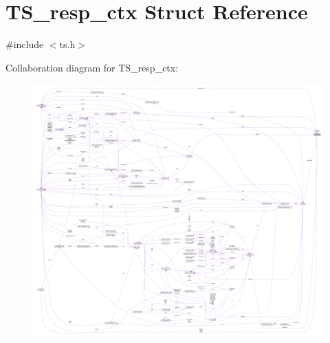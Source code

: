 \hypertarget{struct_t_s__resp__ctx}{}\section{T\+S\+\_\+resp\+\_\+ctx Struct Reference}
\label{struct_t_s__resp__ctx}


{\ttfamily \#include $<$ts.\+h$>$}



Collaboration diagram for T\+S\+\_\+resp\+\_\+ctx\+:\nopagebreak
\begin{figure}[H]
\begin{center}
\leavevmode
\includegraphics[width=350pt]{struct_t_s__resp__ctx__coll__graph}
\end{center}
\end{figure}

